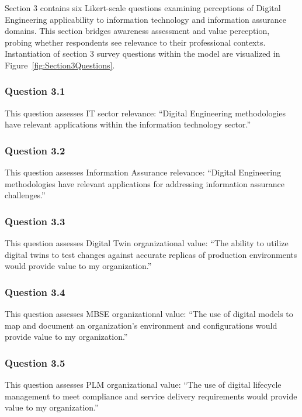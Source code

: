 Section 3 contains six Likert-scale questions examining perceptions of Digital Engineering applicability to information technology and information assurance domains. This section bridges awareness assessment and value perception, probing whether respondents see relevance to their professional contexts. Instantiation of section 3 survey questions within the model are visualized in Figure~\ref{fig:Section3Questions}.

\subsubsection{Question 3.1}

This question assesses IT sector relevance: ``Digital Engineering methodologies have relevant applications within the information technology sector.''

\subsubsection{Question 3.2}

This question assesses Information Assurance relevance: ``Digital Engineering methodologies have relevant applications for addressing information assurance challenges.''

\subsubsection{Question 3.3}

This question assesses Digital Twin organizational value: ``The ability to utilize digital twins to test changes against accurate replicas of production environments would provide value to my organization.''

\subsubsection{Question 3.4}

This question assesses MBSE organizational value: ``The use of digital models to map and document an organization's environment and configurations would provide value to my organization.''

\subsubsection{Question 3.5}

This question assesses PLM organizational value: ``The use of digital lifecycle management to meet compliance and service delivery requirements would provide value to my organization.''

